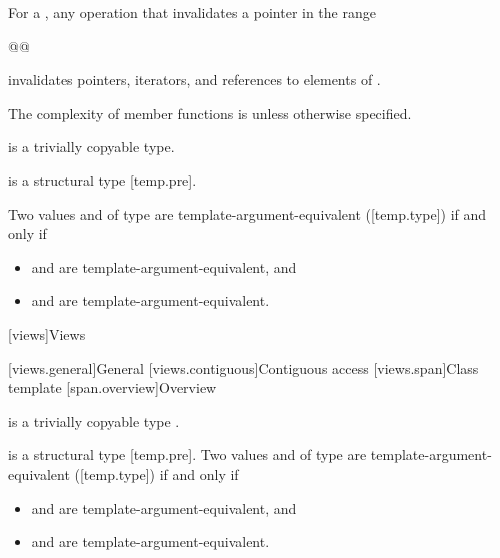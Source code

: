 \documentclass{wg21}
\begin{document}
\pnum
For a ,
any operation that invalidates a pointer
in the range
\begin{codeblock}
    @@
\end{codeblock}
invalidates pointers, iterators, and references
to elements of .

\pnum
The complexity of  member functions is 
unless otherwise specified.

\pnum
{} is
a trivially copyable type.

\begin{addedblock}
 is
a structural type [temp.pre].

\begin{addedblock}
Two values  and  of type  are template-argument-equivalent ([temp.type]) if and only if
\begin{itemize}
    \item {} and  are template-argument-equivalent, and
    \item {} and  are template-argument-equivalent.
\end{itemize}
\end{addedblock}
\end{addedblock}

\ednote{[...]}


[views]{Views}

[views.general]{General}
[views.contiguous]{Contiguous access}
[views.span]{Class template }
[span.overview]{Overview}


 is
a trivially copyable type .

\begin{addedblock}
 is a structural type [temp.pre].
Two values  and  of type  are template-argument-equivalent ([temp.type]) if and only if
\begin{itemize}
\item {} and  are template-argument-equivalent, and
\item {} and  are template-argument-equivalent.
\end{itemize}
\end{addedblock}
\end{document}
